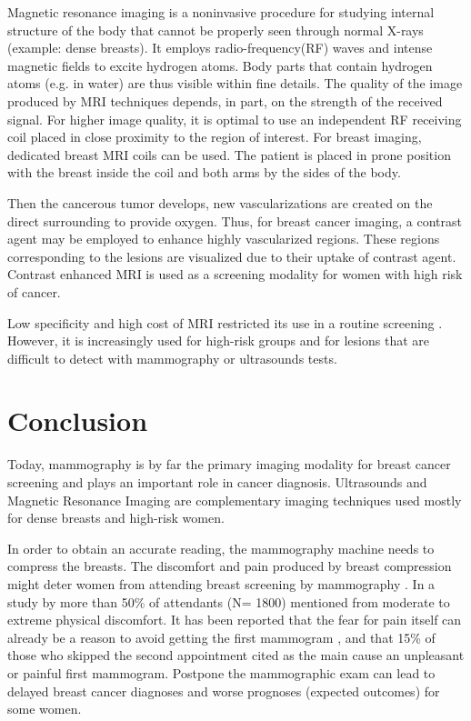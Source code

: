 Magnetic resonance imaging is a noninvasive procedure for studying internal structure of the body that cannot be properly seen through normal X-rays (example: dense breasts).  It employs radio-frequency(RF) waves and intense magnetic fields to excite hydrogen atoms. Body parts that contain hydrogen atoms (e.g. in water) are thus visible within fine details. The quality of the image produced by MRI techniques depends, in part, on the strength of the received signal. For higher image quality, it is optimal to use an independent RF receiving coil placed in close proximity to the region of interest.  For breast imaging, dedicated breast MRI coils can be used. The patient is placed in prone position with the breast inside the coil and both arms by the sides of the body.

Then the cancerous tumor develops, new vascularizations are created on the direct surrounding to provide oxygen.
Thus, for breast cancer imaging, a contrast agent may be employed to enhance highly vascularized regions. These regions corresponding to the lesions are visualized due to their uptake of contrast agent. Contrast enhanced MRI is used as a screening modality for women with high risk of cancer.  

Low specificity and high cost of MRI restricted its use in a routine screening \citep{peters_meta_2008}. However, it is increasingly used for high-risk groups and for lesions that are difficult to detect with mammography or ultrasounds tests. 


\section{Conclusion}\label{section:conlusion}
Today, mammography is by far the primary imaging modality for breast cancer screening and plays an important role in cancer diagnosis. Ultrasounds and Magnetic Resonance Imaging are complementary imaging techniques used mostly for dense breasts and high-risk women.
 
In order to obtain an accurate reading, the mammography machine needs to compress the breasts.  The discomfort and pain produced by breast compression might deter women from attending breast screening by mammography \citep{aro_psychosocial_1999,fleming_intermittent_2013}. In a study by \citep{dullum_rates_2000} more than 50\% of attendants (N= 1800) mentioned from moderate to extreme physical discomfort.  It has been reported that the
fear for pain itself can already be a reason to avoid getting the first mammogram \citep{andrews_pain_2001}, and that 15\% of those who skipped the second appointment cited as the main cause an unpleasant or painful first mammogram\citep{fleming_intermittent_2013,whelehan_effect_2013}.  Postpone the mammographic exam can lead to delayed breast cancer diagnoses and worse prognoses (expected outcomes) for some women.

